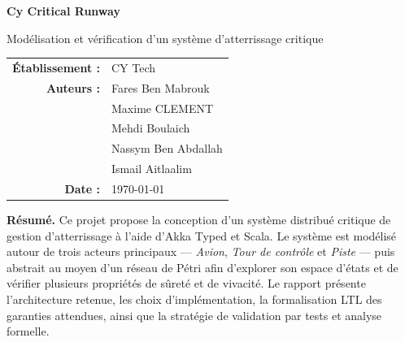 \documentclass[11pt,a4paper]{article}
\begin{document}
\begin{titlepage}
    \centering
    \vspace*{2cm}

    {\Huge\bfseries\color{accent} Cy Critical Runway \par}
    \vspace{0.5cm}
    {\Large Modélisation et vérification d'un système d'atterrissage critique \par}
    \vspace{1.2cm}


    \vfill

    \begin{tabular}{rl}
        \textbf{Établissement :} & CY Tech \\
        \textbf{Auteurs :} & Fares Ben Mabrouk \\
                           & Maxime CLEMENT \\
                           & Mehdi Boulaich \\
                           & Nassym Ben Abdallah \\
                           & Ismail Aitlaalim \\
        \textbf{Date :} & \today
    \end{tabular}

    \vfill

    \begin{minipage}{0.9\textwidth}
        \small
        \textbf{Résumé.} Ce projet propose la conception d'un système distribué critique de gestion d'atterrissage à l'aide d'Akka Typed et Scala. Le système est modélisé autour de trois acteurs principaux --- \emph{Avion}, \emph{Tour de contrôle} et \emph{Piste} --- puis abstrait au moyen d'un réseau de Pétri afin d'explorer son espace d'états et de vérifier plusieurs propriétés de sûreté et de vivacité. Le rapport présente l'architecture retenue, les choix d'implémentation, la formalisation LTL des garanties attendues, ainsi que la stratégie de validation par tests et analyse formelle.
    \end{minipage}
\end{titlepage}
\end{document}
